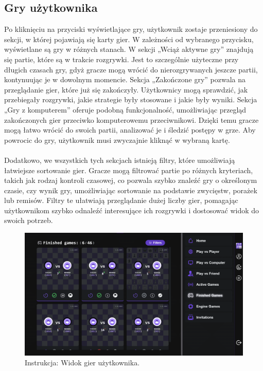 \documentclass[12pt,a4paper]{article}
\begin{document}
\newpage

\subsection{Gry użytkownika}
Po kliknięciu na przyciski wyświetlające gry, użytkownik zostaje przeniesiony do sekcji, w której pojawiają się karty gier. W zależności od wybranego przycisku, wyświetlane są gry w różnych stanach. W sekcji „Wciąż aktywne gry” znajdują się partie, które są w trakcie rozgrywki. Jest to szczególnie użyteczne przy długich czasach gry, gdyż gracze mogą wrócić do nierozgrywanych jeszcze partii, kontynuując je w dowolnym momencie. Sekcja „Zakończone gry” pozwala na przeglądanie gier, które już się zakończyły. Użytkownicy mogą sprawdzić, jak przebiegały rozgrywki, jakie strategie były stosowane i jakie były wyniki. Sekcja „Gry z komputerem” oferuje podobną funkcjonalność, umożliwiając przegląd zakończonych gier przeciwko komputerowemu przeciwnikowi. Dzięki temu gracze mogą łatwo wrócić do swoich partii, analizować je i śledzić postępy w grze. Aby powrocic do gry, użytkownik musi zwyczajnie kliknąć w wybraną kartę.
\\\\
Dodatkowo, we wszystkich tych sekcjach istnieją filtry, które umożliwiają łatwiejsze sortowanie gier. Gracze mogą filtrować partie po różnych kryteriach, takich jak rodzaj kontroli czasowej, co pozwala szybko znaleźć gry o określonym czasie, czy wynik gry, umożliwiając sortowanie na podstawie zwycięstw, porażek lub remisów. Filtry te ułatwiają przeglądanie dużej liczby gier, pomagając użytkownikom szybko odnaleźć interesujące ich rozgrywki i dostosować widok do swoich potrzeb.

\vspace{0.5cm}
\begin{figure}[h!]
    \centering
    \includegraphics[width=1\textwidth]{images/ins_min_games.png}
    \caption{Instrukcja: Widok gier użytkownika.}
\end{figure}
\end{document}
